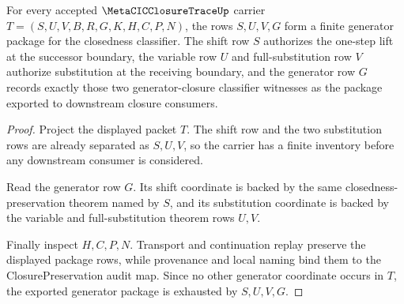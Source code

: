 \begin{theorem}
\label{thm:metacicclosuretrace-substitution-shift-generator-package}
For every accepted $\MetaCICClosureTraceUp$ carrier $T=(S,U,V,B,R,G,K,H,C,P,N)$, the rows $S,U,V,G$ form a finite generator package for the closedness classifier. The shift row $S$ authorizes the one-step lift at the successor boundary, the variable row $U$ and full-substitution row $V$ authorize substitution at the receiving boundary, and the generator row $G$ records exactly those two generator-closure classifier witnesses as the package exported to downstream closure consumers.
\end{theorem}
\begin{proof}
Project the displayed packet $T$. The shift row and the two substitution rows are already separated as $S,U,V$, so the carrier has a finite inventory before any downstream consumer is considered.

Read the generator row $G$. Its shift coordinate is backed by the same closedness-preservation theorem named by $S$, and its substitution coordinate is backed by the variable and full-substitution theorem rows $U,V$.

Finally inspect $H,C,P,N$. Transport and continuation replay preserve the displayed package rows, while provenance and local naming bind them to the ClosurePreservation audit map. Since no other generator coordinate occurs in $T$, the exported generator package is exhausted by $S,U,V,G$.
\end{proof}

